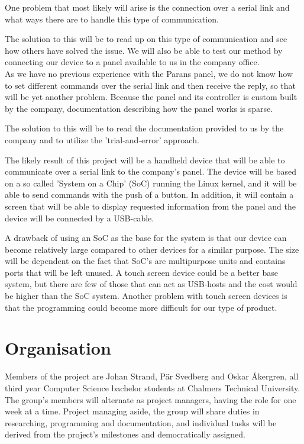 \documentclass[a4paper]{article}
\begin{document}
        \noindent One problem that most likely will arise is the connection over a serial link and what ways there are to handle this type of communication.

        The solution to this will be to read up on this type of communication and see how others have solved the issue. We will also be able to test our method by connecting our device to a panel available to us in the company office.\\

        \noindent As we have no previous experience with the Parans panel, we do not know how to set different commands over the serial link and then receive the reply, so that will be yet another problem. Because the panel and its controller is custom built by the company, documentation describing how the panel works is sparse.

        The solution to this will be to read the documentation provided to us by the company and to utilize the 'trial-and-error' approach.

        \newpage

        \noindent The likely result of this project will be a handheld device that will be able to communicate over a serial link to the company's panel. The device will be based on a so called 'System on a Chip' (SoC) running the Linux kernel, and it will be able to send commands with the push of a button. In addition, it will contain a screen that will be able to display requested information from the panel and the device will be connected by a USB-cable.

        A drawback of using an SoC as the base for the system is that our device can become relatively large compared to other devices for a similar purpose. The size will be dependent on the fact that SoC's are multipurpose units and contains ports that will be left unused. A touch screen device could be a better base system, but there are few of those that can act as USB-hosts and the cost would be higher than the SoC system. Another problem with touch screen devices is that the programming could become more difficult for our type of product.

   \section*{Organisation} %
	\label{sec:organisation}
		Members of the project are Johan Strand, Pär Svedberg and Oskar Åkergren, all third year Computer Science bachelor students at Chalmers Technical University. The group's members will alternate as project managers, having the role for one week at a time. Project managing aside, the group will share duties in researching, programming and documentation, and individual tasks will be derived from the project's milestones and democratically assigned. \\
\end{document}
